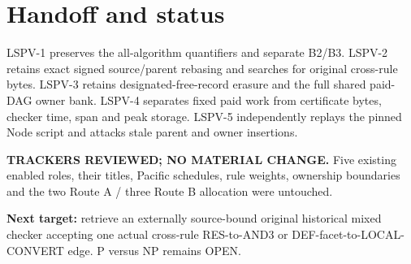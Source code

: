 \documentclass[11pt]{article}
\begin{document}
\section*{Handoff and status}
LSPV-1 preserves the all-algorithm quantifiers and separate B2/B3. LSPV-2 retains exact signed source/parent rebasing and searches for original cross-rule bytes. LSPV-3 retains designated-free-record erasure and the full shared paid-DAG owner bank. LSPV-4 separates fixed paid work from certificate bytes, checker time, span and peak storage. LSPV-5 independently replays the pinned Node script and attacks stale parent and owner insertions.
\par\noindent\textbf{TRACKERS REVIEWED; NO MATERIAL CHANGE.} Five existing enabled roles, their titles, Pacific schedules, rule weights, ownership boundaries and the two Route A / three Route B allocation were untouched.
\par\noindent\textbf{Next target:} retrieve an externally source-bound original historical mixed checker accepting one actual cross-rule RES-to-AND3 or DEF-facet-to-LOCAL-CONVERT edge. P versus NP remains OPEN.
\end{document}
